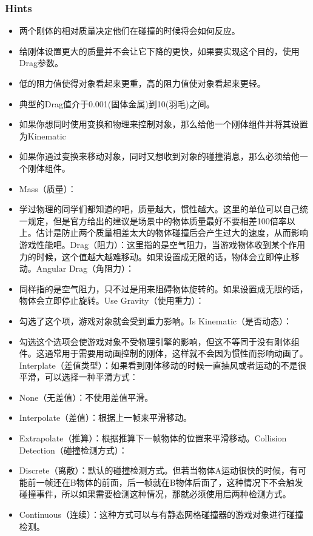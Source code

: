 \documentclass[9pt, b5paper]{article}
\begin{document}
\subsubsection{Hints}
\label{sec:org22592e6}
\begin{itemize}
\item 两个刚体的相对质量决定他们在碰撞的时候将会如何反应。
\item 给刚体设置更大的质量并不会让它下降的更快，如果要实现这个目的，使用Drag参数。
\item 低的阻力值使得对象看起来更重，高的阻力值使对象看起来更轻。
\item 典型的Drag值介于0.001(固体金属)到10(羽毛)之间。
\item 如果你想同时使用变换和物理来控制对象，那么给他一个刚体组件并将其设置为Kinematic
\item 如果你通过变换来移动对象，同时又想收到对象的碰撞消息，那么必须给他一个刚体组件。
\item Mass（质量）：
\item 学过物理的同学们都知道的吧，质量越大，惯性越大。这里的单位可以自己统一规定，但是官方给出的建议是场景中的物体质量最好不要相差100倍率以上。估计是防止两个质量相差太大的物体碰撞后会产生过大的速度，从而影响游戏性能吧。Drag（阻力）：这里指的是空气阻力，当游戏物体收到某个作用力的时候，这个值越大越难移动。如果设置成无限的话，物体会立即停止移动。Angular Drag（角阻力）：
\item 同样指的是空气阻力，只不过是用来阻碍物体旋转的。如果设置成无限的话，物体会立即停止旋转。Use Gravity（使用重力）：
\item 勾选了这个项，游戏对象就会受到重力影响。Is Kinematic（是否动态）：
\item 勾选这个选项会使游戏对象不受物理引擎的影响，但这不等同于没有刚体组件。这通常用于需要用动画控制的刚体，这样就不会因为惯性而影响动画了。Interplate（差值类型）：如果看到刚体移动的时候一直抽风或者运动的不是很平滑，可以选择一种平滑方式：
\item None（无差值）：不使用差值平滑。
\item Interpolate（差值）：根据上一帧来平滑移动。
\item Extrapolate（推算）：根据推算下一帧物体的位置来平滑移动。Collision Detection（碰撞检测方式）：
\item Discrete（离散）：默认的碰撞检测方式。但若当物体A运动很快的时候，有可能前一帧还在B物体的前面，后一帧就在B物体后面了，这种情况下不会触发碰撞事件，所以如果需要检测这种情况，那就必须使用后两种检测方式。
\item Continuous（连续）：这种方式可以与有静态网格碰撞器的游戏对象进行碰撞检测。

\end{itemize}
\end{document}
